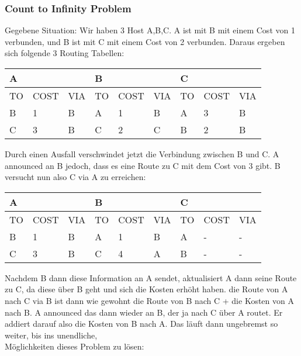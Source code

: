 		\subsubsection{Count to Infinity Problem} 
			Gegebene Situation: Wir haben 3 Host A,B,C. A ist mit B mit einem Cost von 1 verbunden, und B ist mit C mit einem Cost von 2 verbunden. Daraus ergeben sich folgende 3 Routing Tabellen:
			\begin{table}[ht]
				\centering
				\begin{tabular}{|lll|lll|lll|}
				\hline
				\multicolumn{3}{|l|}{A} & \multicolumn{3}{l|}{B} & \multicolumn{3}{l|}{C} \\
				\hline
				\hline
				TO   & COST   & VIA   & TO   & COST   & VIA   & TO   & COST   & VIA   \\
				\hline
				B    & 1      & B     & A    & 1      & B     & A    & 3      & B     \\
				C    & 3      & B     & C    & 2      & C     & B    & 2      & B    \\
				\hline
				\end{tabular}
			\end{table}
			Durch einen Ausfall verschwindet jetzt die Verbindung zwischen B und C. A announced an B jedoch, dass es eine Route zu C mit dem Cost von 3 gibt. B versucht nun also C via A zu erreichen:
			\begin{table}[ht]
				\centering
				\begin{tabular}{|lll|lll|lll|}
				\hline
				\multicolumn{3}{|l|}{A} & \multicolumn{3}{l|}{B} & \multicolumn{3}{l|}{C} \\
				\hline
				\hline
				TO   & COST   & VIA   & TO   & COST   & VIA   & TO   & COST   & VIA   \\
				\hline
				B    & 1      & B     & A    & 1      & B     & A    & -      & -     \\
				C    & 3      & B     & C    & 4      & A     & B    & -      & -    \\
				\hline
				\end{tabular}
			\end{table}
			Nachdem B dann diese Information an A sendet, aktualisiert A dann seine Route zu C, da diese über B geht und sich die Kosten erhöht haben. die Route von A nach C via B ist dann wie gewohnt die Route von B nach C + die Kosten von A nach B. A announced das dann wieder an B, der ja nach C über A routet. Er addiert darauf also die Kosten von B nach A. Das läuft dann ungebremst so weiter, bis ins unendliche, \\
			Möglichkeiten dieses Problem zu lösen:
			
